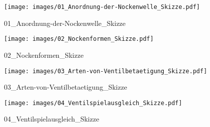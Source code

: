 %
%
%
\begin{figure}[!hb]%
    \centering
  \texttt{[image: images/01\_Anordnung-der-Nockenwelle\_Skizze.pdf]}%
  \caption{01_Anordnung-der-Nockenwelle_Skizze}%
\end{figure}

%
%
\begin{figure}[!hb]%
    \centering
  \texttt{[image: images/02\_Nockenformen\_Skizze.pdf]}%
  \caption{02_Nockenformen_Skizze}%
\end{figure}

%
%
\begin{figure}[!hb]%
    \centering
  \texttt{[image: images/03\_Arten-von-Ventilbetaetigung\_Skizze.pdf]}%
  \caption{03_Arten-von-Ventilbetaetigung_Skizze}%
\end{figure}

%
%
\begin{figure}[!hb]%
    \centering
  \texttt{[image: images/04\_Ventilspielausgleich\_Skizze.pdf]}%
  \caption{04_Ventilspielausgleich_Skizze}%
\end{figure}

